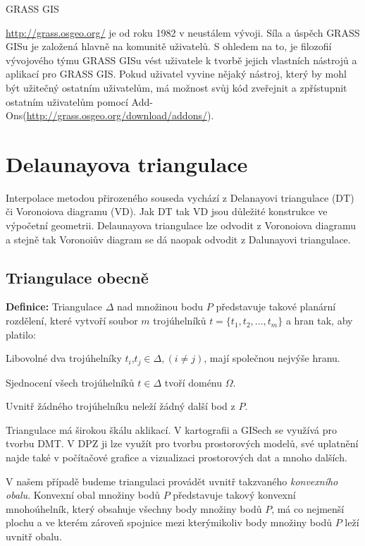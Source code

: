 \documentclass[12pt,a4paper]{article}
\begin{document}
GRASS GIS{\url{http://grass.osgeo.org/} je od roku 1982 v neustálem vývoji. Síla a úspěch GRASS GISu
je založená hlavně na komunitě uživatelů. S ohledem na to, je
filozofií vývojového týmu GRASS GISu vést uživatele k tvorbě jejich
vlastních nástrojů a aplikací pro GRASS GIS. Pokud uživatel vyvine
nějaký nástroj, který by mohl být užitečný ostatním uživatelům, má
možnost svůj kód zveřejnit a zpřístupnit ostatním uživatelům pomocí
Add-Ons(\url{http://grass.osgeo.org/download/addons/}).

\newpage
\section{Delaunayova triangulace}

Interpolace metodou přirozeného souseda vychází z Delanayovi
triangulace (DT) či Voronoiova diagramu (VD). Jak DT tak VD jsou důležité
konstrukce ve výpočetní geometrii. Delaunayova triangulace lze odvodit
z Voronoiova diagramu a stejně tak Voronoiův diagram se dá naopak
odvodit z Dalunayovi triangulace.

\subsection{Triangulace obecně}
\textbf{Definice\cite{TB1}:} Triangulace $\Delta$ nad množinou bodu
$P$ představuje takové planární rozdělení, které vytvoří soubor $m$
trojúhelníků $t = \{ t_1, t_2,...,t_m \}$ a hran tak, aby platilo:

Libovolné dva trojúhelníky $t_i$,$t_j \in \Delta, (i \neq j)$, mají
společnou nejvýše hranu.

Sjednocení všech trojúhelníků $t \in \Delta$ tvoří doménu $\Omega$.

Uvnitř žádného trojúhelníku neleží žádný další bod z $P$.

\bigskip

Triangulace má širokou škálu aklikací. V kartografii a GISech se
využívá pro tvorbu DMT. V DPZ ji lze využít pro tvorbu prostorových
modelů, své uplatnění najde také v počítačové grafice a vizualizaci
prostorových dat a mnoho dalších.

V našem případě budeme triangulaci provádět uvnitř takzvaného
\emph{konvexního obalu}. Konvexní obal množiny bodů $P$ představuje
takový konvexní mnohoúhelník, který obsahuje všechny body množiny bodů
$P$, má co nejmenší plochu a ve kterém zároveň spojnice mezi
kterýmikoliv body množiny bodů $P$ leží uvnitř obalu.

}
\end{document}
